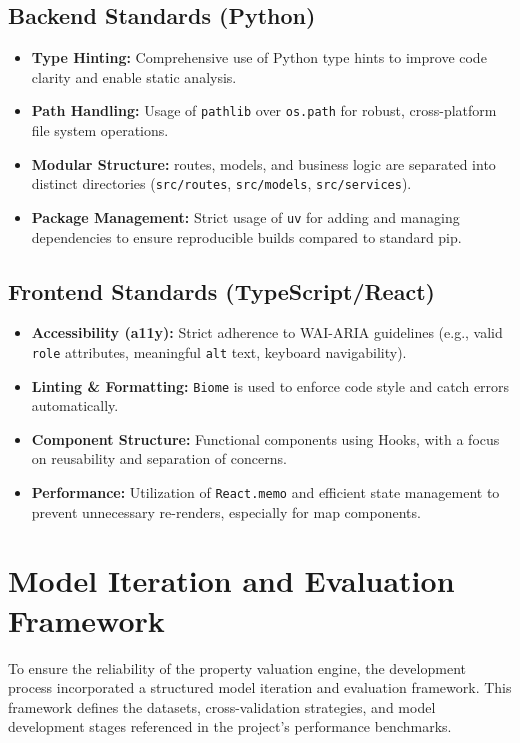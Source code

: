 \subsection{Backend Standards (Python)}
\begin{itemize}
    \item \textbf{Type Hinting:} Comprehensive use of Python type hints to improve code clarity and enable static analysis.
    \item \textbf{Path Handling:} Usage of \texttt{pathlib} over \texttt{os.path} for robust, cross-platform file system operations.
    \item \textbf{Modular Structure:} routes, models, and business logic are separated into distinct directories (\texttt{src/routes}, \texttt{src/models}, \texttt{src/services}).
    \item \textbf{Package Management:} Strict usage of \texttt{uv} for adding and managing dependencies to ensure reproducible builds compared to standard pip.
\end{itemize}

\subsection{Frontend Standards (TypeScript/React)}
\begin{itemize}
    \item \textbf{Accessibility (a11y):} Strict adherence to WAI-ARIA guidelines (e.g., valid \texttt{role} attributes, meaningful \texttt{alt} text, keyboard navigability).
    \item \textbf{Linting \& Formatting:} \texttt{Biome} is used to enforce code style and catch errors automatically.
    \item \textbf{Component Structure:} Functional components using Hooks, with a focus on reusability and separation of concerns.
    \item \textbf{Performance:} Utilization of \texttt{React.memo} and efficient state management to prevent unnecessary re-renders, especially for map components.
\end{itemize}

\section{Model Iteration and Evaluation Framework}

To ensure the reliability of the property valuation engine, the development process incorporated a structured model iteration and evaluation framework. This framework defines the datasets, cross-validation strategies, and model development stages referenced in the project's performance benchmarks.

